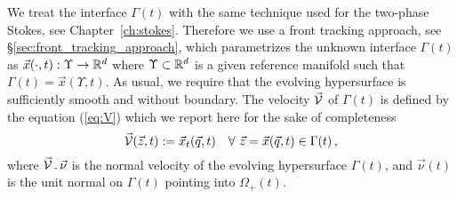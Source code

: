 We treat the interface $\Gamma(t)$ with the same technique used for the
two-phase Stokes, see Chapter~\ref{ch:stokes}. Therefore we use a front tracking
approach, see \S\ref{sec:front_tracking_approach}, which parametrizes the
unknown interface $\Gamma(t)$ as $\vec x(\cdot,t):\Upsilon\to\mathbb R^d$ where
$\Upsilon\subset\mathbb R^d$ is a given reference manifold such that $\Gamma(t) = \vec
x(\Upsilon,t)$. As usual, we require that the evolving hypersurface is
sufficiently smooth and without boundary. The velocity $\vec{\mathcal{V}}$ of $\Gamma(t)$ is
defined by the equation (\ref{eq:V}) which we report here for the sake of
completeness
\begin{equation*}
\vec{\mathcal{V}}(\vec z, t) := \vec x_t(\vec q, t) \quad
\forall\ \vec z = \vec x(\vec q,t) \in \Gamma(t)\,,
\end{equation*}
where $\vec{\mathcal{V}} \,.\,\vec \nu$ is the normal velocity of the evolving hypersurface
$\Gamma(t)$, and $\vec\nu(t)$ is the unit normal on $\Gamma(t)$ pointing into
$\Omega_+(t)$.


